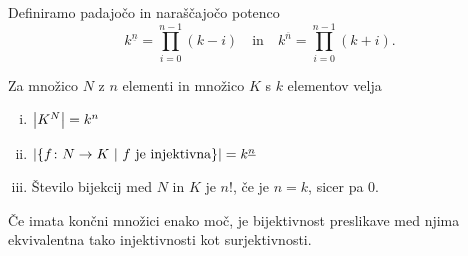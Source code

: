 \begin{definicija}
Definiramo padajočo in naraščajočo potenco
\[
k^{\underline{n}} = \prod_{i=0}^{n-1} (k - i)
\quad \text{in} \quad
k^{\overline{n}} = \prod_{i=0}^{n-1} (k + i).
\]
\end{definicija}

\begin{trditev}
Za množico $N$ z $n$ elementi in množico $K$ s $k$ elementov velja

\begin{enumerate}[i)]
\item $\left\lvert K^N\right\rvert = k^n$
\item $\left\lvert \left\{f \colon N \to K~\middle\vert~\text{$f$ je injektivna}\right\}\right\rvert =
k^{\underline{n}}$
\item Število bijekcij med $N$ in $K$ je $n!$, če je $n = k$, sicer
pa $0$.
\end{enumerate}
\end{trditev}

\obvs

\begin{opomba}
Če imata končni množici enako moč, je bijektivnost preslikave med
njima ekvivalentna tako injektivnosti kot surjektivnosti.
\end{opomba}
